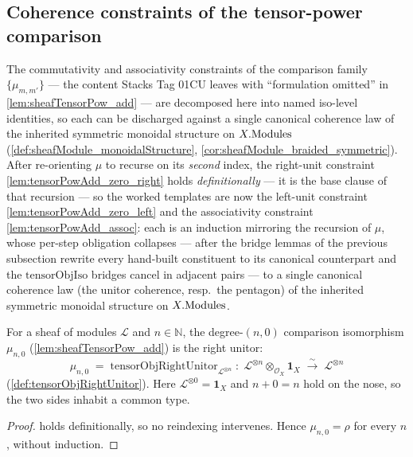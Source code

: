 \subsection{Coherence constraints of the tensor-power comparison}
\label{subsec:sgr_tensorPowAdd_constraints}

The commutativity and associativity constraints of the comparison family
\(\{\mu_{m,m'}\}\) --- the content Stacks Tag 01CU leaves with ``formulation
omitted'' in \cref{lem:sheafTensorPow_add} --- are decomposed here into named
iso-level identities, so each can be discharged against a single canonical
coherence law of the inherited symmetric monoidal structure on \(X.\mathrm{Modules}\)
(\cref{def:sheafModule_monoidalStructure},
\cref{cor:sheafModule_braided_symmetric}). After re-orienting \(\mu\) to recurse on
its \emph{second} index, the right-unit constraint
\cref{lem:tensorPowAdd_zero_right} holds \emph{definitionally} --- it is the base
clause of that recursion --- so the worked templates are now the left-unit
constraint \cref{lem:tensorPowAdd_zero_left} and the associativity constraint
\cref{lem:tensorPowAdd_assoc}: each is an induction mirroring the recursion of
\(\mu\), whose per-step obligation collapses --- after the bridge lemmas of the
previous subsection rewrite every hand-built constituent to its canonical
counterpart and the \(\mathrm{tensorObjIso}\) bridges cancel in adjacent pairs ---
to a single canonical coherence law (the unitor coherence, resp.\ the pentagon) of
the inherited symmetric monoidal structure on \(X.\mathrm{Modules}\).

\begin{lemma}

  \label{lem:tensorPowAdd_zero_right}
  For a sheaf of modules \(\mathcal{L}\) and \(n \in \mathbb{N}\), the degree-\((n,0)\)
  comparison isomorphism \(\mu_{n,0}\) (\cref{lem:sheafTensorPow_add}) is the right
  unitor:
  \[
    \mu_{n,0} \;=\;
      \mathrm{tensorObjRightUnitor}_{\mathcal{L}^{\otimes n}}
    \;:\; \mathcal{L}^{\otimes n} \otimes_{\mathcal{O}_X} \mathbf{1}_X
    \;\xrightarrow{\ \sim\ }\; \mathcal{L}^{\otimes n}
  \]
  (\cref{def:tensorObjRightUnitor}). Here \(\mathcal{L}^{\otimes 0} = \mathbf{1}_X\)
  and \(n + 0 = n\) hold on the nose, so the two sides inhabit a common type.
\end{lemma}

\begin{proof}
  \leanok
  holds definitionally, so no reindexing intervenes. Hence \(\mu_{n,0} = \rho\) for
  every \(n\), without induction.
\end{proof}

